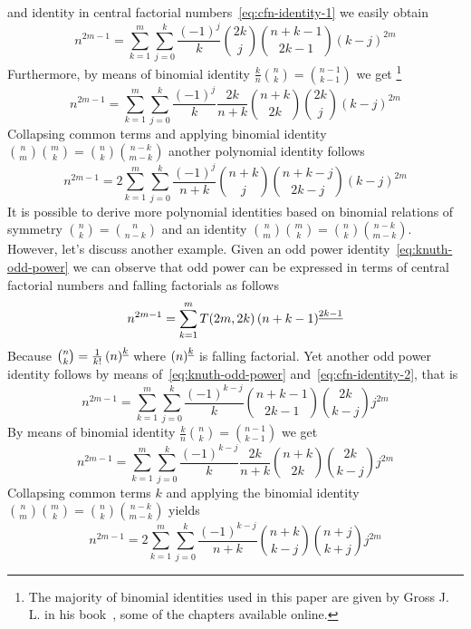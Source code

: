 and identity in central factorial numbers~\eqref{eq:cfn-identity-1}
we easily obtain
\begin{equation*}
    n^{2m-1} = \sum_{k=1}^{m} \sum_{j=0}^{k} \frac{(-1)^j}{k} \binom{2k}{j} \binom{n+k-1}{2k-1} (k-j)^{2m}
\end{equation*}
Furthermore, by means of binomial identity $\frac{k}{n} \binom{n}{k} = \binom{n-1}{k-1}$ we get
\footnote{The majority of binomial identities used in this paper are given by Gross J. L.
in his book~\cite{gross2016combinatorial}, some of the chapters available online.}
\begin{equation*}
    n^{2m-1} = \sum_{k=1}^{m} \sum_{j=0}^{k} \frac{(-1)^{j}}{k} \frac{2k}{n+k} \binom{n+k}{2k} \binom{2k}{j} (k-j)^{2m}
\end{equation*}
Collapsing common terms and applying binomial identity $\binom{n}{m} \binom{m}{k} = \binom{n}{k} \binom{n-k}{m-k}$
another polynomial identity follows
\begin{equation*}
    n^{2m-1} = 2\sum_{k=1}^{m} \sum_{j=0}^{k} \frac{(-1)^{j}}{n+k} \binom{n+k}{j} \binom{n+k-j}{2k-j} (k-j)^{2m}
\end{equation*}
It is possible to derive more polynomial identities based on binomial relations of symmetry $\binom{n}{k} = \binom{n}{n-k}$
and an identity $\binom{n}{m} \binom{m}{k} = \binom{n}{k} \binom{n-k}{m-k}$.
However, let's discuss another example.
Given an odd power identity~\eqref{eq:knuth-odd-power} we can observe that odd power can be expressed in terms of
central factorial numbers and falling factorials as follows
\begin{equation*}
    n^{2m-1} = \sum_{k=1}^{m} T(2m,2k) \left(n+k-1 \right)^{\underline{2k-1}}
\end{equation*}
Because $\binom{n}{k} = \frac{1}{k!} \left(n \right)^{\underline{k}}$ where $\left(n \right)^{\underline{k}}$ is falling factorial.
Yet another odd power identity follows by means of~\eqref{eq:knuth-odd-power} and~\eqref{eq:cfn-identity-2}, that is
\begin{equation*}
    n^{2m-1} = \sum_{k=1}^{m} \sum_{j=0}^{k} \frac{(-1)^{k-j}}{k} \binom{n+k-1}{2k-1} \binom{2k}{k-j} j^{2m}
\end{equation*}
By means of binomial identity $\frac{k}{n} \binom{n}{k} = \binom{n-1}{k-1}$ we get
\begin{equation*}
    n^{2m-1} = \sum_{k=1}^{m} \sum_{j=0}^{k} \frac{(-1)^{k-j}}{k} \frac{2k}{n+k} \binom{n+k}{2k} \binom{2k}{k-j} j^{2m}
\end{equation*}
Collapsing common terms $k$ and applying the binomial identity
$\binom{n}{m} \binom{m}{k} = \binom{n}{k} \binom{n-k}{m-k}$ yields
\begin{equation*}
    n^{2m-1} = 2\sum_{k=1}^{m} \sum_{j=0}^{k} \frac{(-1)^{k-j}}{n+k} \binom{n+k}{k-j} \binom{n+j}{k+j} j^{2m}
\end{equation*}